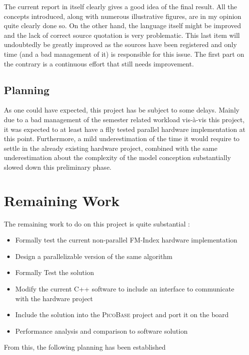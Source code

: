 The current report in itself clearly gives a good idea of the final result. All the concepts introduced, along with  numerous illustrative figures, are in my opinion quite clearly done so. On the other hand, the language itself might be improved and the lack of correct source quotation is very problematic. This last item will undoubtedly be greatly improved as the sources have been registered and only time (and a bad management of it) is responsible for this issue. The first part on the contrary is a continuous effort that still needs improvement. 

\subsection{Planning}

As one could have expected, this project has be subject to some delays. Mainly due to a bad management of the semester related workload vis-à-vis this project, it was expected to at least have a flly tested parallel hardware implementation at this point. Furthermore, a mild underestimation of the time it would require to settle in the already existing hardware project, combined with the same underestimation about the complexity of the model conception substantially slowed down this preliminary phase.

\section{Remaining Work}

The remaining work to do on this project is quite substantial :
\begin{itemize}
    \item Formally test the current non-parallel FM-Index hardware implementation
    \item Design a parallelizable version of the same algorithm
    \item Formally Test the solution
    \item Modify the current \textsc{C++} software to include an interface to communicate with the hardware project
    \item Include the solution into the \textsc{PicoBase} project and port it on the board
    \item Performance analysis and comparison to software solution
\end{itemize}

From this, the following planning has been established